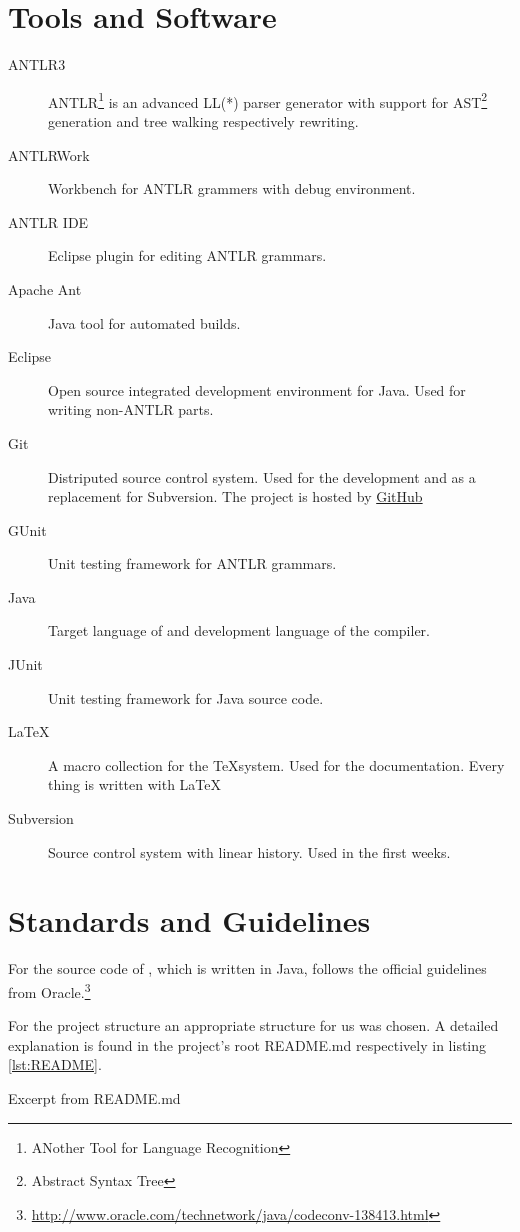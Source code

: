 \section{Tools and Software}
\begin{description}
	\item[ANTLR3] ANTLR\footnote{ANother Tool for Language Recognition} is an advanced LL(*) parser generator with support for AST\footnote{Abstract Syntax Tree} generation and tree walking respectively rewriting.
	\item[ANTLRWork] Workbench for ANTLR grammers with debug environment.
	\item[ANTLR IDE] Eclipse plugin for editing ANTLR grammars.
	\item[Apache Ant] Java tool for automated builds.
	\item[Eclipse] Open source integrated development environment for Java. Used for writing non-ANTLR parts.
	\item[Git] Distriputed source control system. Used for the development and as a replacement for Subversion. The project is hosted by \href{https://www.github.com/rubenbaer/ooplss}{GitHub}
	\item[GUnit] Unit testing framework for ANTLR grammars.
	\item[Java] Target language of \ooplss and development language of the compiler.
	\item[JUnit] Unit testing framework for Java source code.
	\item[\LaTeX] A macro collection for the \TeX system. Used for the documentation. Every thing is written with \LaTeX
	\item[Subversion] Source control system with linear history. Used in the first weeks.
\end{description}

\section{Standards and Guidelines}
For the source code of \ooplss, which is written in Java, follows the official
guidelines from Oracle.\footnote{\href{http://www.oracle.com/technetwork/java/codeconv-138413.html}{http://www.oracle.com/technetwork/java/codeconv-138413.html}}

For the project structure an appropriate structure for us was chosen.
A detailed explanation is found in the project's root README.md
respectively in listing \ref{lst:README}.

\begin{listing}
	\caption{Excerpt from README.md}
	\label{lst:README}
\end{listing}
